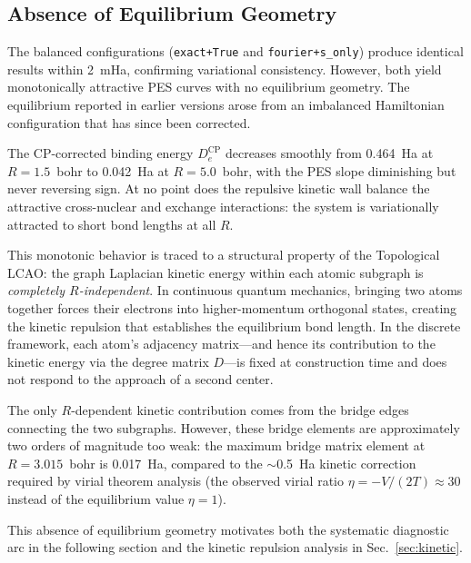 \documentclass[aps,pra,twocolumn,superscriptaddress,longbibliography]{revtex4-2}
\begin{document}
\subsection{Absence of Equilibrium Geometry}
\label{sec:contraction}

The balanced configurations (\texttt{exact+True} and
\texttt{fourier+s\_only}) produce identical results within 2~mHa,
confirming variational consistency.  However, both yield monotonically
attractive PES curves with no equilibrium geometry.  The equilibrium
reported in earlier versions arose from an imbalanced Hamiltonian
configuration that has since been corrected.

The CP-corrected binding energy $D_e^{\mathrm{CP}}$ decreases smoothly
from 0.464~Ha at $R=1.5$~bohr to 0.042~Ha at $R=5.0$~bohr, with the
PES slope diminishing but never reversing sign.  At no point does the
repulsive kinetic wall balance the attractive cross-nuclear and exchange
interactions: the system is variationally attracted to short bond
lengths at all $R$.

This monotonic behavior is traced to a structural property of the
Topological LCAO: the graph Laplacian kinetic energy within each atomic
subgraph is \emph{completely $R$-independent}.  In continuous quantum
mechanics, bringing two atoms together forces their electrons into
higher-momentum orthogonal states, creating the kinetic repulsion that
establishes the equilibrium bond length.  In the discrete framework,
each atom's adjacency matrix---and hence its contribution to the kinetic
energy via the degree matrix $D$---is fixed at construction time and
does not respond to the approach of a second center.

The only $R$-dependent kinetic contribution comes from the bridge edges
connecting the two subgraphs.  However, these bridge elements are
approximately two orders of magnitude too weak: the maximum bridge
matrix element at $R=3.015$~bohr is 0.017~Ha, compared to the $\sim$0.5~Ha
kinetic correction required by virial theorem analysis (the observed
virial ratio $\eta = -V/(2T) \approx 30$ instead of the equilibrium
value $\eta = 1$).

This absence of equilibrium geometry motivates both the systematic
diagnostic arc in the following section and the kinetic repulsion
analysis in Sec.~\ref{sec:kinetic}.

\end{document}
